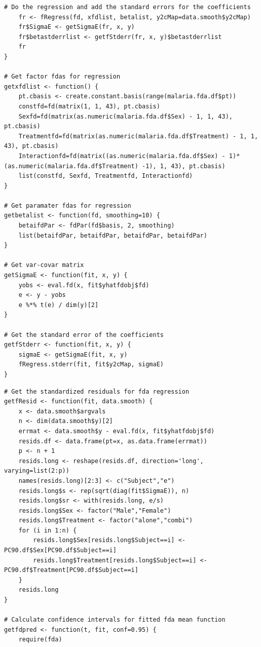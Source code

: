 \begin{singlespace}
\begin{lstlisting}[caption=Functions for fda regression,label=R:fregress]
	# Do the regression and add the standard errors for the coefficients
	fr <- fRegress(fd, xfdlist, betalist, y2cMap=data.smooth$y2cMap)
	fr$SigmaE <- getSigmaE(fr, x, y)
	fr$betastderrlist <- getfStderr(fr, x, y)$betastderrlist
	fr
}

# Get factor fdas for regression
getxfdlist <- function() {
	pt.cbasis <- create.constant.basis(range(malaria.fda.df$pt))
	constfd=fd(matrix(1, 1, 43), pt.cbasis)
	Sexfd=fd(matrix(as.numeric(malaria.fda.df$Sex) - 1, 1, 43), pt.cbasis)
	Treatmentfd=fd(matrix(as.numeric(malaria.fda.df$Treatment) - 1, 1, 43), pt.cbasis)
	Interactionfd=fd(matrix((as.numeric(malaria.fda.df$Sex) - 1)*(as.numeric(malaria.fda.df$Treatment) -1), 1, 43), pt.cbasis)
	list(constfd, Sexfd, Treatmentfd, Interactionfd)
}

# Get paramater fdas for regression
getbetalist <- function(fd, smoothing=10) {
	betaifdPar <- fdPar(fd$basis, 2, smoothing)
	list(betaifdPar, betaifdPar, betaifdPar, betaifdPar)
}

# Get var-covar matrix
getSigmaE <- function(fit, x, y) {
	yobs <- eval.fd(x, fit$yhatfdobj$fd)
	e <- y - yobs
	e %*% t(e) / dim(y)[2]
}

# Get the standard error of the coefficients
getfStderr <- function(fit, x, y) {
	sigmaE <- getSigmaE(fit, x, y)
	fRegress.stderr(fit, fit$y2cMap, sigmaE)
}
\end{lstlisting}

\begin{lstlisting}[caption=Functions to calculate fda regression standardized residuals and confidence intervals for fitted values,label=R:fdaresid]
# Get the standardized residuals for fda regression
getfResid <- function(fit, data.smooth) {
	x <- data.smooth$argvals
	n <- dim(data.smooth$y)[2]
	errmat <- data.smooth$y - eval.fd(x, fit$yhatfdobj$fd)
	resids.df <- data.frame(pt=x, as.data.frame(errmat))
	p <- n + 1
	resids.long <- reshape(resids.df, direction='long', varying=list(2:p))
	names(resids.long)[2:3] <- c("Subject","e")
	resids.long$s <- rep(sqrt(diag(fit$SigmaE)), n)
	resids.long$sr <- with(resids.long, e/s)
	resids.long$Sex <- factor("Male","Female")
	resids.long$Treatment <- factor("alone","combi")
	for (i in 1:n) {
		resids.long$Sex[resids.long$Subject==i] <- PC90.df$Sex[PC90.df$Subject==i]
		resids.long$Treatment[resids.long$Subject==i] <- PC90.df$Treatment[PC90.df$Subject==i]
	}
	resids.long
}

# Calculate confidence intervals for fitted fda mean function
getfdpred <- function(t, fit, conf=0.95) {
	require(fda)


\end{lstlisting}
\end{singlespace}
